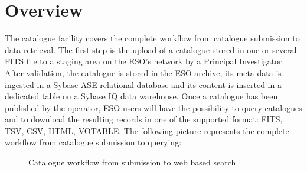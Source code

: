 \documentclass[11pt,twoside]{article}
\begin{document}
\section{Overview}
The catalogue facility covers the complete workflow from catalogue submission to data retrieval. The first step is the upload of a catalogue stored in one or several FITS file to a staging area on the ESO's network by a Principal Investigator. After validation, the catalogue is stored in the ESO archive, its meta data is ingested in a Sybase ASE relational database and its content is inserted in a dedicated table on a Sybase IQ data warehouse. Once a catalogue has been published by the operator, ESO users will have the possibility to query catalogues and to download the resulting records in one of the supported format: FITS, TSV, CSV, HTML, VOTABLE. The following picture represents the complete workflow from catalogue submission to querying:
\begin{center}
\setlength\fboxsep{1pt}
\setlength\fboxrule{1pt}
\begin{figure}[h]
\caption{Catalogue workflow from submission to web based search}
\end{figure}
\end{center}
\end{document}
